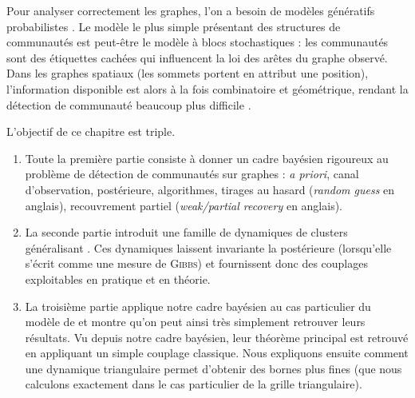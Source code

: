 Pour analyser correctement les graphes, l'on a besoin de modèles génératifs probabilistes \cite{AvrachenkovDreveton2022}.
Le modèle le plus simple présentant des structures de communautés est peut-être le modèle à blocs stochastiques \cite{SBM1983,SBM2011,Abbe2017,PercolationSBM} : les communautés sont des étiquettes cachées qui influencent la loi des arêtes du graphe observé. Dans les graphes spatiaux (les sommets portent en attribut une position), l'information disponible est alors à la fois combinatoire et géométrique, rendant la détection de communauté beaucoup plus difficile \cite{SankararamanBaccelli2018,SankararamanBaccelliAbbe2020}.

L'objectif de ce chapitre est triple.
\begin{enumerate}
    \item Toute la première partie consiste à donner un cadre bayésien rigoureux au problème de détection de communautés sur graphes : \emph{a priori}, canal d'observation, postérieure, algorithmes, tirages au hasard (\emph{random guess} en anglais), recouvrement partiel (\emph{weak/partial recovery} en anglais). 
    \item La seconde partie introduit une famille de dynamiques de clusters généralisant \SW{} \cite{SwendsenWang,EdwardsSokal}. Ces dynamiques laissent invariante la postérieure (lorsqu'elle s'écrit comme une mesure de \textsc{Gibbs}) et fournissent donc des couplages exploitables en pratique et en théorie.
    \item La troisième partie applique notre cadre bayésien au cas particulier du modèle de \SB{} \cite{SankararamanBaccelli2018} et montre qu'on peut ainsi très simplement retrouver leurs résultats. Vu depuis notre cadre bayésien, leur théorème principal est retrouvé en appliquant un simple couplage \SW{} classique. Nous expliquons ensuite comment une dynamique triangulaire permet d'obtenir des bornes plus fines (que nous calculons exactement dans le cas particulier de la grille triangulaire).
\end{enumerate}


